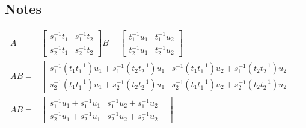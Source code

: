 \subsection{Notes}
\begin{align*}
    A =& 
    \begin{bmatrix}
    s_1^{-1}t_1 & s_1^{-1}t_2\\
    s_2^{-1}t_1 & s_2^{-1}t_2
    \end{bmatrix}
    B =
    \begin{bmatrix}
    t_1^{-1}u_1 & t_1^{-1}u_2\\
    t_2^{-1}u_1 & t_2^{-1}u_2
    \end{bmatrix}\\
    AB =& 
    \begin{bmatrix}
    s_1^{-1}(t_1t_1^{-1})u_1 + s_1^{-1}(t_2t_2^{-1})u_1& s_1^{-1}(t_1t_1^{-1})u_2 + s_1^{-1}(t_2t_2^{-1})u_2\\
    s_2^{-1}(t_1t_1^{-1})u_1 + s_2^{-1}(t_2t_2^{-1})u_1&
    s_2^{-1}(t_1t_1^{-1})u_2 + s_2^{-1}(t_2t_2^{-1})u_2&
    \end{bmatrix}\\
    AB =& 
    \begin{bmatrix}
    s_1^{-1}u_1 + s_1^{-1}u_1& 
    s_1^{-1}u_2 + s_1^{-1}u_2\\
    s_2^{-1}u_1 + s_2^{-1}u_1&
    s_2^{-1}u_2 + s_2^{-1}u_2&
    \end{bmatrix}
\end{align*}